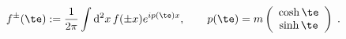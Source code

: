 \begin{equation}\label{Phi}
    f^\pm(\te) := \frac{1}{2\pi}\int\mathrm{d}^2x\,f(\pm x)e^{ip(\te)x},\qquad p(\te)=m\left(
      \begin{array}{c}
        \cosh\te\\
        \sinh\te
      \end{array}
\right)\;.
  \end{equation}

